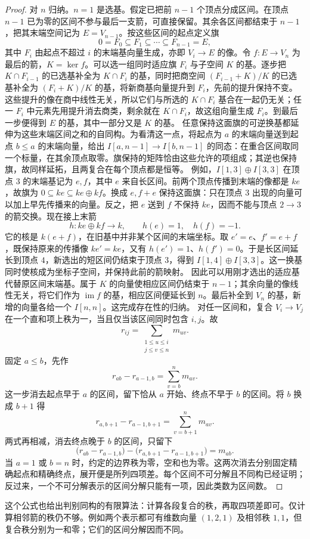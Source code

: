 \begin{proof}
	对 \(n\) 归纳。\(n=1\) 是选基。假定已把前 \(n-1\) 个顶点分成区间。在顶点 \(n-1\) 已为零的区间不参与最后一支箭，可直接保留。其余各区间都结束于 \(n-1\)，把其末端空间记为 \(E=V_{n-1}\)。按这些区间的起点定义旗
	\[
		0=F_0\subseteq F_1\subseteq\cdots\subseteq F_{n-1}=E,
	\]
	其中 \(F_i\) 由起点不超过 \(i\) 的末端基向量生成，亦即 \(V_i\to E\) 的像。令 \(f:E\to V_n\) 为最后的箭，\(K=\ker f\)。可以选一组同时适应旗 \(F_i\) 与子空间 \(K\) 的基。逐步把 \(K\cap F_{i-1}\) 的已选基补全为 \(K\cap F_i\) 的基，同时把商空间 \((F_{i-1}+K)/K\) 的已选基补全为 \((F_i+K)/K\) 的基，将新商基向量提升到 \(F_i\)，先前的提升保持不变。这些提升的像在商中线性无关，所以它们与所选的 \(K\cap F_i\) 基合在一起仍无关；任一 \(F_i\) 中元素先用提升消去商类，剩余就在 \(K\cap F_i\)，故这组向量生成 \(F_i\)。到最后一步便得到 \(E\) 的基，其中一部分又是 \(K\) 的基。 任意保持这面旗的可逆换基都延伸为这些末端区间之和的自同构。为看清这一点，将起点为 \(a\) 的末端向量送到起点 \(b\le a\) 的末端向量，给出 \(I[a,n-1]\to I[b,n-1]\) 的同态：在重合区间取同一个标量，在其余顶点取零。旗保持的矩阵恰由这些允许的项组成；其逆也保持旗，故同样延拓，且两复合在每个顶点都是恒等。 例如，\(I[1,3]\oplus I[3,3]\) 在顶点 \(3\) 的末端基记为 \(e,f\)，其中 \(e\) 来自长区间。前两个顶点传播到末端的像都是 \(ke\)，故旗为 \(0\subseteq ke\subseteq ke\oplus kf\)。换成 \(e,f+e\) 保持这面旗：只在顶点 \(3\) 出现的向量可以加上早先传播来的向量。反之，把 \(e\) 送到 \(f\) 不保持 \(ke\)，因而不能与顶点 \(2\to3\) 的箭交换。现在接上末箭
	\[
		h:ke\oplus kf\longrightarrow k,\qquad h(e)=1,\quad h(f)=-1.
	\]
	它的核是 \(k(e+f)\)，在旧基中并非某个区间的末端坐标。取 \(e'=e\)、\(f'=e+f\)，既保持原来的传播像 \(ke'=ke\)，又有 \(h(e')=1\)、\(h(f')=0\)。于是长区间延长到顶点 \(4\)，新选出的短区间仍结束于顶点 \(3\)，得到 \(I[1,4]\oplus I[3,3]\)。这一换基同时使核成为坐标子空间，并保持此前的箭映射。 因此可以用刚才选出的适应基代替原区间末端基。属于 \(K\) 的向量使相应区间仍结束于 \(n-1\)；其余向量的像线性无关，将它们作为 \(\operatorname{im}f\) 的基，相应区间便延长到 \(n\)。最后补全到 \(V_n\) 的基，新增的向量各给一个 \(I[n,n]\)。这完成存在性的归纳。 对任一区间和，复合 \(V_i\to V_j\) 在一个直和项上秩为一，当且仅当该区间同时包含 \(i,j\)。故
	\[
		r_{ij}=\sum_{\substack{1\le u\le i\\j\le v\le n}}m_{uv}.
	\]
	固定 \(a\le b\)，先作
	\[
		r_{ab}-r_{a-1,b}=\sum_{v=b}^n m_{av}.
	\]
	这一步消去起点早于 \(a\) 的区间，留下恰从 \(a\) 开始、终点不早于 \(b\) 的区间。将 \(b\) 换成 \(b+1\) 得
	\[
		r_{a,b+1}-r_{a-1,b+1}=\sum_{v=b+1}^n m_{av}.
	\]
	两式再相减，消去终点晚于 \(b\) 的区间，只留下
	\[
		\bigl(r_{ab}-r_{a-1,b}\bigr) -\bigl(r_{a,b+1}-r_{a-1,b+1}\bigr)=m_{ab}.
	\]
	当 \(a=1\) 或 \(b=n\) 时，约定的边界秩为零，空和也为零。这两次消去分别固定精确起点和精确终点，展开便是所列四项差。每个区间不可分解且不同构已经证明；反过来，一个不可分解表示的区间分解只能有一项，因此类数为区间数。
\end{proof}
这个公式也给出判别同构的有限算法：计算各段复合的秩，再取四项差即可。仅计算相邻箭的秩仍不够。例如两个表示都可有维数向量 \((1,2,1)\) 及相邻秩 \(1,1\)，但复合秩分别为一和零；它们的区间分解因而不同。

